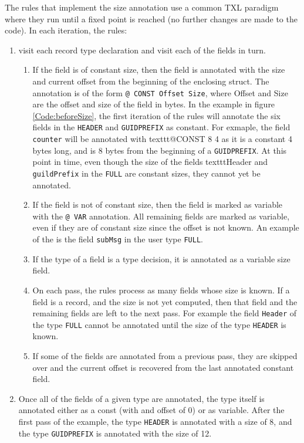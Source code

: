 \documentclass[12pt,oneside,letterpaper]{article}
\begin{document}
The rules that implement the size annotation use a common TXL paradigm where they run until a fixed point is reached (no further changes are made to the code). In each iteration, the rules:
\begin{enumerate}
\item visit each record type declaration and visit each of the fields in turn.
\begin {enumerate}

\item If the field is of constant size, then the field is annotated with the size and current offset from the beginning of the enclosing struct. The annotation is of the form \texttt{@ CONST  Offset Size}, where Offset and Size are the offset and size of the field in bytes. In the example in figure \ref{Code:beforeSize}, the first iteration of the rules will annotate the six fields in the \texttt{HEADER} and \texttt{GUIDPREFIX} as constant. For exmaple, the field \texttt{counter} will be annotated with texttt{@CONST 8 4} as it is a constant 4 bytes long, and is 8 bytes from the beginning of a \texttt{GUIDPREFIX}. At this point in time, even though the size of the fields texttt{Header} and \texttt{guildPrefix} in the \texttt{FULL} are constant sizes, they cannot yet be annotated.

\item If the field is not of constant size, then the field is marked as variable with the \texttt{@ VAR} annotation. All remaining fields are marked as variable, even if they are of constant size since the offset is not known. An example of the is the field \texttt{subMsg} in the user type \texttt{FULL}.

\item If the type of a field is a type decision, it is annotated  as a variable size field.

\item On each pass, the rules process as many fields whose size is known. If a field is a record, and the size is not yet computed, then that field and the remaining fields are left to the next pass. For example the field \texttt{Header} of the type \texttt{FULL} cannot be annotated until the size of the type \texttt{HEADER} is known.

\item If some of the fields are annotated from a previous pass, they are skipped over and the current offset is recovered from the last annotated constant field.

\end {enumerate}

\item Once all of the fields of a given type are annotated, the type itself is annotated either as a const (with and offset of 0) or as variable. After the first pass of the example, the type \texttt{HEADER} is annotated with a size of 8, and the type \texttt{GUIDPREFIX} is annotated with the size of 12.
\end{enumerate}
\end{document}
